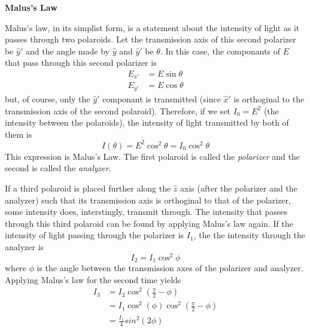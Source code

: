 \documentclass[11pt]{article}
\begin{document}
\begin{multicols}{2}
     \selectfont \textbf{Malus's Law}
    
     \selectfont 

    Malus's law, in its simplist form, is a statement about the intensity of light as it passes through two polaroids. Let the transmission axis of this second polarizer be $\hat{y}'$ and the angle made by $\hat{y}$ and $\hat{y}'$ be $\theta$. In this case, the componants of $E$ that pass through this second polarizer is
    \[
        \begin{split}
            E_{x'} &= E \sin \theta \\
            E_{y'} &= E \cos \theta
        \end{split}
    \]
    but, of course, only the $\hat{y}'$ componant is transmitted (since $\hat{x}'$ is orthoginal to the transmission axis of the second polaroid). Therefore, if we set $I_0 = E^2$ (the intensity between the polaroids), the intensity of light transmitted by both of them is
    \begin{equation}
        \label{MalusLaw}
        I(\theta) = E^2 \cos^2\theta = I_0 \cos^2\theta
    \end{equation}
    This expression is Malus's Law. The first polaroid is called the \textit{polarizer} and the second is called the \textit{analyzer}.

    If a third polaroid is placed further along the $\hat{z}$ axis (after the polarizer and the analyzer) such that its transmission axis is orthoginal to that of the polarizer, some intensity does, interstingly, transmit through. The intensity that passes through this third polaroid can be found by applying Malus's law again. If the intensity of light passing through the polarizer is $I_1$, the the intensity through the analyzer is
    \[
        I_2 = I_1 \cos^2 \phi
    \]
    where $\phi$ is the angle between the transmission axes of the polarizer and analyzer. Applying Malus's law for the second time yields
    \begin{equation}
        \begin{split}
            I_3 &= I_2 \cos^2 (\frac{\pi}{2} - \phi) \\
            &= I_1 \cos^2 (\phi) \cos^2 (\frac{\pi}{2} - \phi) \\
            & = \frac{I_1}{4} sin^2 (2 \phi) \label{MalusLaw3}
        \end{split}
    \end{equation}

    


\end{multicols}
\end{document}
